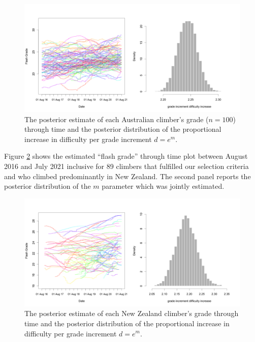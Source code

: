 \documentclass[11pt]{article}
\begin{document}
\begin{figure}
\centering
\includegraphics[width=\textwidth]{../results/aus/ascents-from-2016-08-01-to-2021-08-01-minAscents30-minFails1-Sport-AU-posterior.png}
\caption{\small The posterior estimate of each Australian climber's grade ($n=100$) through time and the posterior distribution of the proportional increase in difficulty per grade increment $d = e^m$.}
\label{aus_ascents_by_attempt}
\end{figure}

Figure \ref{nz_ascents_by_attempt} shows the estimated ``flash grade'' through time plot between August 2016 and July 2021 inclusive for 89 climbers that fulfilled our selection criteria and who climbed predominantly in New Zealand. The second panel reports the posterior distribution of the $m$ parameter which was jointly estimated.


\begin{figure}
\centering
\includegraphics[width=\textwidth]{../results/nz/ascents-from-2016-08-01-to-2021-08-01-minAscents30-minFails1-Sport-AU-posterior.png}
\caption{\small The posterior estimate of each New Zealand climber's grade through time and the posterior distribution of the proportional increase in difficulty per grade increment $d = e^m$.}
\label{nz_ascents_by_attempt}
\end{figure}
\end{document}
